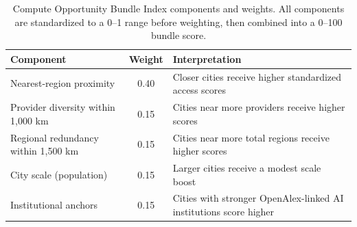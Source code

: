 \begin{table}[ht]
\centering
\small
\begin{tabular}{p{}cp{}}
\toprule
Component & Weight & Interpretation \\ 
\midrule
Nearest-region proximity & 0.40 & Closer cities receive higher standardized access scores \\ 
Provider diversity within 1,000 km & 0.15 & Cities near more providers receive higher scores \\ 
Regional redundancy within 1,500 km & 0.15 & Cities near more total regions receive higher scores \\ 
City scale (population) & 0.15 & Larger cities receive a modest scale boost \\ 
Institutional anchors & 0.15 & Cities with stronger OpenAlex-linked AI institutions score higher \\ 
\bottomrule
\end{tabular}
\caption{Compute Opportunity Bundle Index components and weights. All components are standardized to a 0--1 range before weighting, then combined into a 0--100 bundle score.}
\label{tab:bundle_weights}
\end{table}
